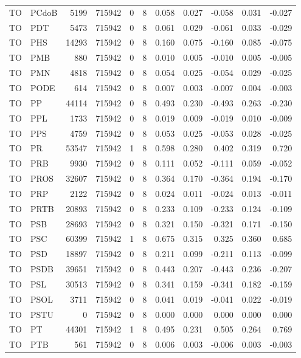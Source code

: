 \begin{landscape}
\begin{longtable}{llrrrrrrrrr}
TO & PCdoB & 5199 & 715942 & 0 & 8 & 0.058 & 0.027 & -0.058 & 0.031 & -0.027 \\
TO & PDT & 5473 & 715942 & 0 & 8 & 0.061 & 0.029 & -0.061 & 0.033 & -0.029 \\
TO & PHS & 14293 & 715942 & 0 & 8 & 0.160 & 0.075 & -0.160 & 0.085 & -0.075 \\
TO & PMB & 880 & 715942 & 0 & 8 & 0.010 & 0.005 & -0.010 & 0.005 & -0.005 \\
TO & PMN & 4818 & 715942 & 0 & 8 & 0.054 & 0.025 & -0.054 & 0.029 & -0.025 \\
TO & PODE & 614 & 715942 & 0 & 8 & 0.007 & 0.003 & -0.007 & 0.004 & -0.003 \\
TO & PP & 44114 & 715942 & 0 & 8 & 0.493 & 0.230 & -0.493 & 0.263 & -0.230 \\
TO & PPL & 1733 & 715942 & 0 & 8 & 0.019 & 0.009 & -0.019 & 0.010 & -0.009 \\
TO & PPS & 4759 & 715942 & 0 & 8 & 0.053 & 0.025 & -0.053 & 0.028 & -0.025 \\
TO & PR & 53547 & 715942 & 1 & 8 & 0.598 & 0.280 & 0.402 & 0.319 & 0.720 \\
TO & PRB & 9930 & 715942 & 0 & 8 & 0.111 & 0.052 & -0.111 & 0.059 & -0.052 \\
TO & PROS & 32607 & 715942 & 0 & 8 & 0.364 & 0.170 & -0.364 & 0.194 & -0.170 \\
TO & PRP & 2122 & 715942 & 0 & 8 & 0.024 & 0.011 & -0.024 & 0.013 & -0.011 \\
TO & PRTB & 20893 & 715942 & 0 & 8 & 0.233 & 0.109 & -0.233 & 0.124 & -0.109 \\
TO & PSB & 28693 & 715942 & 0 & 8 & 0.321 & 0.150 & -0.321 & 0.171 & -0.150 \\
TO & PSC & 60399 & 715942 & 1 & 8 & 0.675 & 0.315 & 0.325 & 0.360 & 0.685 \\
TO & PSD & 18897 & 715942 & 0 & 8 & 0.211 & 0.099 & -0.211 & 0.113 & -0.099 \\
TO & PSDB & 39651 & 715942 & 0 & 8 & 0.443 & 0.207 & -0.443 & 0.236 & -0.207 \\
TO & PSL & 30513 & 715942 & 0 & 8 & 0.341 & 0.159 & -0.341 & 0.182 & -0.159 \\
TO & PSOL & 3711 & 715942 & 0 & 8 & 0.041 & 0.019 & -0.041 & 0.022 & -0.019 \\
TO & PSTU & 0 & 715942 & 0 & 8 & 0.000 & 0.000 & 0.000 & 0.000 & 0.000 \\
TO & PT & 44301 & 715942 & 1 & 8 & 0.495 & 0.231 & 0.505 & 0.264 & 0.769 \\
TO & PTB & 561 & 715942 & 0 & 8 & 0.006 & 0.003 & -0.006 & 0.003 & -0.003 \\

\end{longtable}
\end{landscape}
